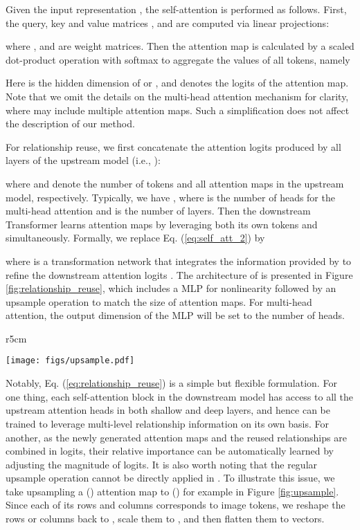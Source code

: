 \documentclass{article}
\begin{document}
Given the input representation , the self-attention is performed as follows. First, the query, key and value matrices ,  and  are computed via linear projections:

where ,  and  are weight matrices. Then the attention map is calculated by a scaled dot-product operation with softmax to aggregate the values of all tokens, namely

Here  is the hidden dimension of  or , and  denotes the logits of the attention map. Note that we omit the details on the multi-head attention mechanism for clarity, where  may include multiple attention maps. Such a simplification does not affect the description of our method.



For relationship reuse, we first concatenate the attention logits produced by all layers of the upstream model (i.e., ):

where  and  denote the number of tokens and all attention maps in the upstream model, respectively. Typically, we have , where  is the number of heads for the multi-head attention and  is the number of layers. Then the downstream Transformer learns attention maps by leveraging both its own tokens and  simultaneously. Formally, we replace Eq. (\ref{eq:self_att_2}) by

where  is a transformation network that integrates the information provided by  to refine the downstream attention logits . The architecture of  is presented in Figure \ref{fig:relationship_reuse}, which includes a MLP for nonlinearity followed by an upsample operation to match the size of attention maps. For multi-head attention, the output dimension of the MLP will be set to the number of heads.


\begin{wrapfigure}{r}{5cm}
    \vskip -0.15in
    \begin{minipage}[t]{\linewidth}
    \centering
    \texttt{[image: figs/upsample.pdf]}	
    \vskip -0.08in
    \caption{An example for the upsample operation in . \label{fig:upsample}}  
    \end{minipage}
    \vskip -0.15in
\end{wrapfigure}
Notably, Eq. (\ref{eq:relationship_reuse}) is a simple but flexible formulation. For one thing, each self-attention block in the downstream model has access to all the upstream attention heads in both shallow and deep layers, and hence can be trained to leverage multi-level relationship information on its own basis. For another, as the newly generated attention maps and the reused relationships are combined in logits, their relative importance can be automatically learned by adjusting the magnitude of logits. It is also worth noting that the regular upsample operation cannot be directly applied in . To illustrate this issue, we take upsampling a  () attention map to  () for example in Figure \ref{fig:upsample}. Since each of its rows and columns corresponds to  image tokens, we reshape the rows or columns back to , scale them to , and then flatten them to  vectors.
\end{document}
